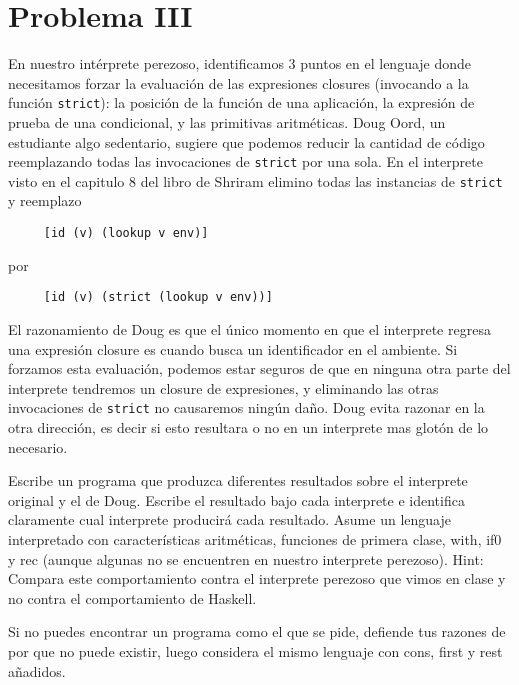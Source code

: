 \documentclass{article}
\begin{document}
\section*{Problema III}
En nuestro intérprete perezoso, identificamos 3 puntos en el lenguaje donde
necesitamos forzar la evaluación de las expresiones closures (invocando a la
función \texttt{strict}): la posición de la función de una aplicación,
la expresión de prueba de una condicional, y las primitivas aritméticas.
Doug Oord, un estudiante algo sedentario, sugiere que podemos reducir
la cantidad de código reemplazando todas las invocaciones de \texttt{strict}
por una sola. En el interprete visto en el capitulo 8 del libro de Shriram
elimino todas las instancias de \texttt{strict} y reemplazo
\begin{verbatim}
     [id (v) (lookup v env)]
\end{verbatim}

por

\begin{verbatim}
     [id (v) (strict (lookup v env))]
\end{verbatim}

El razonamiento de Doug es que el único momento en que el interprete regresa una
expresión closure es cuando busca un identificador en el ambiente. Si forzamos
esta evaluación, podemos estar seguros de que en ninguna otra parte del interprete
tendremos un closure de expresiones, y eliminando las otras invocaciones de
\texttt{strict} no causaremos ningún daño. Doug evita razonar en la otra dirección,
es decir si esto resultara o no en un interprete mas glotón de lo necesario.

Escribe un programa que produzca diferentes resultados sobre el interprete original
y el de Doug. Escribe el resultado bajo cada interprete e identifica claramente
cual interprete producirá cada resultado. Asume un lenguaje interpretado
con características aritméticas, funciones de primera clase, with, if0 y rec
(aunque algunas no se encuentren en nuestro interprete perezoso). Hint: Compara
este comportamiento contra el interprete perezoso que vimos en clase y no contra
el comportamiento de Haskell.

Si no puedes encontrar un programa como el que se pide, defiende tus razones
de por que no puede existir, luego considera el mismo lenguaje con cons, first
y rest añadidos.
\\
\end{document}
